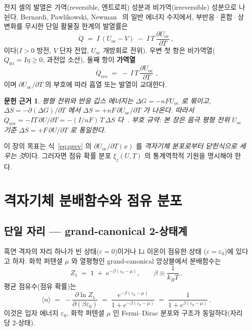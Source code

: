 \documentclass[11pt,a4paper]{article}
\newtheorem*{srcbox}{문헌 근거}
\newcommand{\rev}{\mathrm{rev}}
\newcommand{\irr}{\mathrm{irr}}
\newcommand{\oc}{\mathrm{oc}}
\begin{document}
전지 셀의 발열은 가역(reversible, 엔트로피) 성분과 비가역(irreversible) 성분으로
나뉜다. Bernardi, Pawlikowski, Newman~\cite{bernardi1985} 의 일반 에너지 수지에서,
부반응·혼합·상변화를 무시한 단일 활물질 한계의 발열률은
\begin{equation}
  \dot Q \;=\; I\,(U_\oc-V) \;-\; I\,T\,\frac{\partial U_\oc}{\partial T}\,,
  \label{eq:bernardi}
\end{equation}
이다($I>0$ 방전, $V$ 단자 전압, $U_\oc$ 개방회로 전위). 우변 첫 항은
비가역열($\dot Q_\irr=I\eta\ge0$, 과전압 소산), 둘째 항이 \textbf{가역열}
\begin{equation}
  \boxed{\;\dot Q_\rev \;=\; -\,I\,T\,\dfrac{\partial U_\oc}{\partial T}\;,}
  \label{eq:qrev}
\end{equation}
이며 $\partial U_\oc/\partial T$ 의 부호에 따라 흡열 또는 발열이 교대한다.

\begin{srcbox}
평형 전위와 반응 깁스 에너지는 $\Delta G=-nFU_\oc$ 로 묶이고,
$\Delta S=-\partial(\Delta G)/\partial T$ 에서 $\Delta S=+nF\,\partial U_\oc/\partial T$
가 나온다. 따라서
$\dot Q_\rev=-IT\,\partial U/\partial T=-(I/nF)\,T\,\Delta S$
다~\cite{newman2004,msmr_partI}. 부호 규약: 본 장은 음극 평형 전위 $U_\oc$ 기준
$\Delta S=+F\,\partial U/\partial T$ 로 통일한다.
\end{srcbox}

이 장의 목표는 식~\eqref{eq:qrev} 의 $\partial U_\oc/\partial T(x)$ 를
\emph{격자기체 분포로부터 닫힌식으로 세우는 것}이다. 그러자면 점유 확률 분포
$\xi_j(U,T)$ 의 통계역학적 기원을 명시해야 한다.

\section{격자기체 분배함수와 점유 분포}\label{sec:partition}

\subsection{단일 자리 — grand-canonical 2-상태계}

흑연 격자의 자리 하나가 빈 상태($\varepsilon=0$)이거나 Li 이온이 점유한 상태
($\varepsilon=\varepsilon_0$)에 있다고 하자. 화학 퍼텐셜 $\mu$ 와 열평형인
grand-canonical 앙상블에서 분배함수는
\begin{equation}
  Z_1 \;=\; 1 \;+\; e^{-\beta(\varepsilon_0-\mu)},
  \qquad \beta\equiv\frac{1}{k_BT}\,.
  \label{eq:Z1}
\end{equation}
평균 점유수(점유 확률)는
\begin{equation}
  \langle n\rangle \;=\; -\frac{\partial\ln Z_1}{\partial(\beta\varepsilon_0)}
  \;=\; \frac{e^{-\beta(\varepsilon_0-\mu)}}{1+e^{-\beta(\varepsilon_0-\mu)}}
  \;=\; \frac{1}{1+e^{\beta(\varepsilon_0-\mu)}}\,.
  \label{eq:fd_raw}
\end{equation}
이것은 입자 에너지 $\varepsilon_0$, 화학 퍼텐셜 $\mu$ 인 Fermi--Dirac 분포와
구조가 동일하다(자리당 2-상태).
\end{document}
